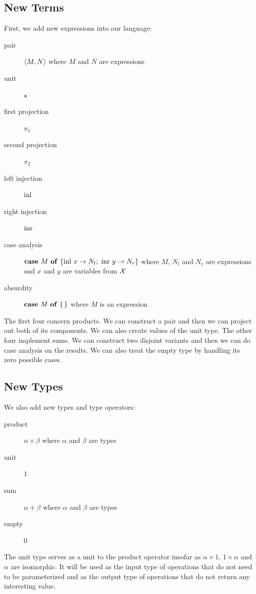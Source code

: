 \subsection{New Terms}

First, we add new expressions into our language:

\begin{description}
  \item[pair] $\left<M, N\right>$ where $M$ and $N$ are expressions
  \item[unit] $\star$
  \item[first projection] $\pi_1$
  \item[second projection] $\pi_2$
  \item[left injection] $\operatorname{inl}$
  \item[right injection] $\operatorname{inr}$
  \item[case analysis] \hspace{1mm} $\text{\textbf{case} $M$ \textbf{of} $\{ \operatorname{inl}\,x \to N_l;\ \operatorname{inr}\,y \to N_r \}$}$ where $M$, $N_l$ and
    $N_r$ are expressions and $x$ and $y$ are variables from $\mathcal{X}$
  \item[absurdity] \hspace{1mm} $\text{\textbf{case} $M$ \textbf{of} \{\,\}}$ where $M$ is an expression
\end{description}

The first four concern products. We can construct a pair and then we can
project out both of its components. We can also create values of the unit
type. The other four implement sums. We can construct two disjoint variants
and then we can do case analysis on the results. We can also treat the
empty type by handling its zero possible cases.

\subsection{New Types}

We also add new types and type operators:

\begin{description}
  \item[product] $\alpha \times \beta$ where $\alpha$ and $\beta$ are types
  \item[unit] $1$
  \item[sum] $\alpha + \beta$ where $\alpha$ and $\beta$ are types
  \item[empty] $0$
\end{description}

The unit type serves as a unit to the product operator insofar as $\alpha
\times 1$, $1 \times \alpha$ and $\alpha$ are isomorphic. It will be used
as the input type of operations that do not need to be parameterized and as
the output type of operations that do not return any interesting value.

